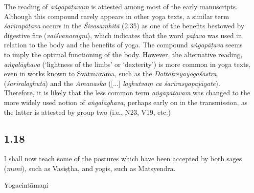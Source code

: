 \begin{ekdosis}
\begin{testimonia}[hp01_017]
\begin{versinnote}
\end{versinnote}

\end{testimonia}

\begin{philcomm}[hp01_017]        
The reading of \emph{aṅgapāṭavam} is attested among most of the early manuscripts. Although this compound rarely appears in other yoga texts, a similar term \emph{śarīrapāṭava} occurs in the \emph{Śivasaṃhitā} (2.35) as one of the benefits bestowed by digestive fire (\emph{vaiśvānarāgni}), which indicates that the word \emph{pāṭava} was used in relation to the body and the benefits of yoga. The compound \emph{aṅgapāṭava} seems to imply the optimal functioning of the body. However, the alternative reading, \emph{aṅgalāghava} (‘lightness of the limbs’ or ‘dexterity’) is more common in yoga texts, even in works known to Svātmārāma, such as the \emph{Dattātreyayogaśāstra} (\emph{śarīralaghutā}) and the \textit{Amanaska} ([...] \emph{laghutvaṃ ca śarīrasyopajāyate}). Therefore, it is likely that the less common term \emph{aṅgapāṭavam} was changed to the more widely used notion of \emph{aṅgalāghava}, perhaps early on in the transmission, as the latter is attested by group two (i.e., N23, V19, etc.) 
\end{philcomm}

\subsection*{1.18}
\begin{translation}[hp01_018]
I shall now teach some of the postures which have been accepted by both sages (\emph{muni}), such as Vasiṣṭha, and yogis, such as Matsyendra.
\end{translation}

\begin{testimonia}[hp01_018]
Yogacintāmaṇi

\begin{versinnote}
\end{versinnote}


\end{testimonia}
\end{ekdosis}
